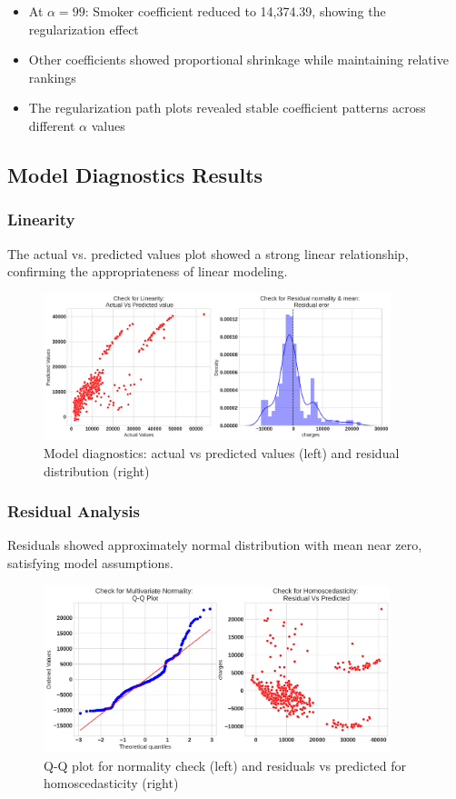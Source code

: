 \documentclass[12pt,a4paper]{article}
\begin{document}
\begin{itemize}
    \item At $\alpha = 99$: Smoker coefficient reduced to 14,374.39, showing the regularization effect
    \item Other coefficients showed proportional shrinkage while maintaining relative rankings
    \item The regularization path plots revealed stable coefficient patterns across different $\alpha$ values
\end{itemize}

\subsection{Model Diagnostics Results}

\subsubsection{Linearity}
The actual vs. predicted values plot showed a strong linear relationship, confirming the appropriateness of linear modeling.

\begin{figure}[H]
\centering
\includegraphics[width=0.9\textwidth]{linearity_check_plots.png}
\caption{Model diagnostics: actual vs predicted values (left) and residual distribution (right)}
\label{fig:linearity_check_plots}
\end{figure}

\subsubsection{Residual Analysis}
Residuals showed approximately normal distribution with mean near zero, satisfying model assumptions.

\begin{figure}[H]
\centering
\includegraphics[width=0.9\textwidth]{qq_plot_homoscedasticity_check.png}
\caption{Q-Q plot for normality check (left) and residuals vs predicted for homoscedasticity (right)}
\label{fig:qq_plot_homoscedasticity_check}
\end{figure}
\end{document}
